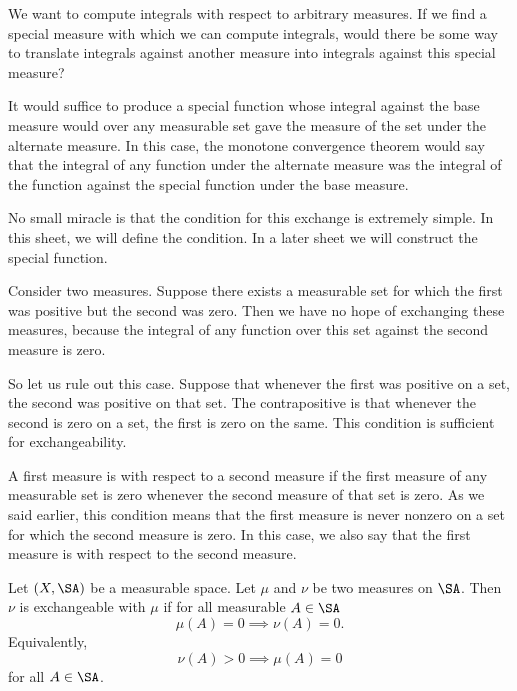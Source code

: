 

We want to compute integrals
with respect to arbitrary measures.
If we find a special measure
with which we can compute integrals,
would there
be some way to translate
integrals against another measure
into integrals against this special
measure?

It would suffice to produce a special function
whose integral against the base measure
would over any measurable set gave
the measure of the set under the alternate
measure.
In this case, the monotone convergence
theorem would say that the integral of
any function under the alternate
measure was the integral of the function
against the special function under the
base measure.

No small miracle is that the condition
for this exchange is extremely simple.
In this sheet, we will define the
condition. In a later sheet we will
construct the special function.


Consider two measures.
Suppose there exists
a measurable set for which the first
was positive but the second was zero.
Then we have no hope of exchanging
these measures, because the integral
of any function over this set against
the second measure is zero.

So let us rule out this case.
Suppose that whenever the
first was positive on a set,
the second was positive on that set.
The contrapositive is that
whenever the second is zero
on a set, the first is zero on the same.
This condition
is sufficient for exchangeability.

A first measure is 
with respect to a second measure
if the first measure of any measurable
set is zero whenever the second measure
of that set is zero.
As we said earlier, this condition
means that the first measure
is never nonzero on a set for which
the second measure is zero.
In this case, we also say that
the first measure is
with respect to the second measure.


Let $(X, \SA)$ be a measurable space.
Let $\mu$ and $\nu$ be two measures
on $\SA$.
Then $\nu$ is exchangeable with $\mu$
if for all measurable $A \in \SA$
\[
  \mu(A) = 0 \implies \nu(A) = 0.
\]
Equivalently,
\[
  \nu(A) > 0 \implies \mu(A) = 0
\]
for all $A \in \SA$.

